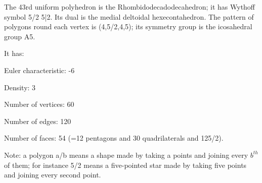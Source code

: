 The 43rd uniform polyhedron is the Rhombidodecadodecahedron; it has Wythoff symbol 5/2 5|2. Its dual is the medial deltoidal hexecontahedron. The pattern of polygons round each vertex is (4,5/2,4,5); its symmetry group is the icosahedral group A5.\par
It has:\par
Euler characteristic: -6\par
Density: 3\par
Number of vertices: 60\par
Number of edges:  120\par
Number of faces: 54 (=12 pentagons and 30 quadrilaterals and 12{5/2}).\par
Note: a polygon a/b means a shape made by taking a points and joining every $b^{th}$  of them; for instance 5/2 means a five-pointed star made by taking five points and joining every second point.